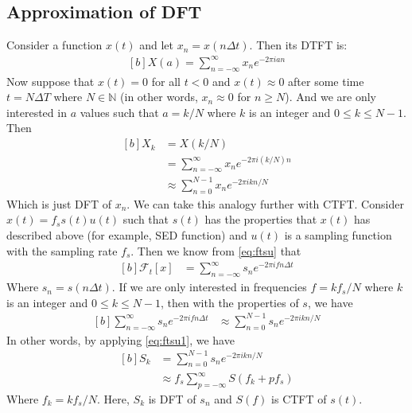 \documentclass[letterpaper, 11pt]{article}
\newcommand{\fsum}[1]{\sum_{#1 = -\infty}^{\infty}} %
\newcommand{\fourier}[2]{\mathcal{F}_{#1}[#2]} %
\newcommand{\ssum}[1]{\sum_{#1 = 0}^{N - 1}} %
\newcommand{\dft}[3]{\ssum{#1} #2 e^{-2\pi i#3#1/N}} %
\newcommand{\dtft}[3]{\fsum{#1} #2 e^{-2\pi i#3#1}}
\numberwithin{equation}{section}
\numberwithin{figure}{section}
\numberwithin{table}{section}
\begin{document}
\subsection{Approximation of DFT}
Consider a function \(x(t)\) and let \(x_{n} = x(n\Delta t)\). Then its DTFT is:
\begin{equation}
	\begin{aligned}[b]
		X(a) = \dtft{n}{x_{n}}{a} 
	\end{aligned}
\end{equation}
Now suppose that \(x(t) = 0\) for all \(t < 0\) and \(x(t) \approx 0\) after some time \(t = N\Delta T\) where \(N \in \mathbb{N}\) (in other words, \(x_{n} \approx 0\) for \(n \ge N\)). And we are only interested in \(a\) values such that \(a = k/N\) where \(k\) is an integer and \(0 \leq k \leq N - 1\). Then
\begin{equation}
	\begin{aligned}[b]
		X_{k} 	&= X(k/N)\\
			&= \dtft{n}{x_{n}}{(k/N)}\\
			&\approx \dft{n}{x_{n}}{k}
	\end{aligned}
\end{equation}
Which is just DFT of \(x_{n}\). We can take this analogy further with CTFT. Consider \(x(t)=f_{s} s(t)u(t)\) such that \(s(t)\) has the properties that \(x(t)\) has described above (for example, SED function) and \(u(t)\) is a sampling function with the sampling rate \(f_{s}\). Then we know from \eqref{eq:ftsu} that
\begin{equation}
	\begin{aligned}[b]
		\fourier{t}{x}
			&= \fsum{n} s_{n} e^{-2\pi ifn\Delta t} 
	\end{aligned}
\end{equation}
Where \(s_{n} = s(n\Delta t)\). If we are only interested in frequencies \(f = kf_{s}/N\) where \(k\) is an integer and \(0 \leq k \leq N - 1\), then with the properties of \(s\), we have
\begin{equation}
	\begin{aligned}[b]
		\fsum{n} s_{n} e^{-2\pi ifn\Delta t}
			&\approx \dft{n}{s_{n}}{k}
	\end{aligned}
\end{equation}
In other words, by applying \eqref{eq:ftsu1}, we have
\begin{equation}
	\begin{aligned}[b]
		S_{k}	&= \dft{n}{s_{n}}{k}\\
			&\approx f_{s}\fsum{p} S(f_{k} + pf_{s}) 
	\end{aligned}
\end{equation}
Where \(f_{k} = kf_{s}/N\). Here, \(S_{k}\) is DFT of \(s_{n}\) and \(S(f)\) is CTFT of \(s(t)\).
\clearpage
\pagestyle{plain}
\printbibliography
{}
\printindex
\end{document}
